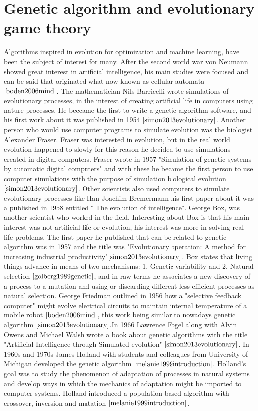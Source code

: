 \documentclass{book}
\begin{document}
\section{Genetic algorithm and evolutionary game theory} \label{sec:genalg}
Algorithms inspired in evolution for optimization and machine learning, have been the subject of interest for many. After the second world war von Neumann showed great interest in artificial intelligence, his main studies were focused and can be said that originated what now known as cellular automata $\cite{boden2006mind}$. The mathematician Nils Barricelli wrote simulations of evolutionary processes, in the interest of creating artificial life in computers using nature processes. He beccame the first to write a genetic algorithm software, and his first work about it was published in 1954 $\cite{simon2013evolutionary}$. Another person who would use computer programs to simulate evolution was the biologist Alexander Fraser. Fraser was interested in evolution, but in the real world evolution happened to slowly for this reason he decided to use simulations created in digital computers. Fraser wrote in 1957 "Simulation of genetic systems by automatic digital computers" and with these he became the first person to use computer simulations with the purpose of simulation biological evolution $\cite{simon2013evolutionary}$.  Other scientists also used computers to simulate evolutionary processes like Han-Joachim Bremermann his first paper  about it was a published in 1958 entitled " The evolution of intelligence".  George Box, was another scientist who worked in the field. Interesting about Box is that his main interest was not artificial life or evolution, his interest was more in solving real life problems. The first paper he published that can be related to genetic algorithm was in 1957 and the title was "Evolutionary operation: A method for increasing industrial productivity"$\cite{simon2013evolutionary}$. Box states that living things advance in means of two mechanisms: 1. Genetic variability and 2. Natural selection $\cite{golberg1989genetic}$, and in raw terms he associates a new discovery of a process to a mutation and using or discarding different less efficient processes as natural selection. George Friedman outlined in 1956 how a "selective feedback computer" might evolve electrical circuits to maintain internal temperature of a mobile robot $\cite{boden2006mind}$, this work being similar to nowadays genetic algorithm $\cite{simon2013evolutionary}$.In 1966 Lawrence Fogel along with Alvin Owens and Michael Walsh wrote a book about genetic algorithms with the title "Artificial Intelligence through Simulated evolution" $\cite{simon2013evolutionary}$.  In 1960s and 1970s James Holland with students and colleagues from University of Michigan developed the genetic algorithm $\cite{melanie1999introduction}$. Holland's goal was to study the phenomenon of adaptation of processes in natural systems and develop ways in which the mechanics of adaptation might be imported to computer systems. Holland introduced a population-based algorithm with crossover, inversion and mutation $\cite{melanie1999introduction}$.
\end{document}
